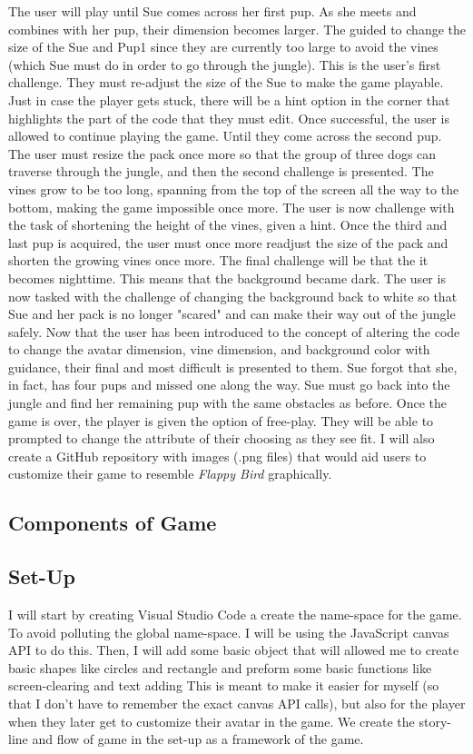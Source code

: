 \documentclass[10pt,twocolumn]{article}
\begin{document}
The user will play until Sue comes across her first pup. As she meets and combines with her pup, their dimension becomes larger. The guided to change the size of the Sue and Pup1 since they are currently too large to avoid the vines (which Sue must do in order to go through the jungle). This is the user's first challenge. They must re-adjust the size of the Sue to make the game playable. Just in case the player gets stuck, there will be a hint option in the corner that highlights the part of the code that they must edit. Once successful, the user is allowed to continue playing the game. Until they come across the second pup. The user must resize the pack once more so that the group of three dogs can traverse through the jungle, and then the second challenge is presented. The vines grow to be too long, spanning from the top of the screen all the way to the bottom, making the game impossible once more. The user is now challenge with the task of shortening the height of the vines, given a hint. Once the third and last pup is acquired, the user must once more readjust the size of the pack and shorten the growing vines once more. The final challenge will be that the it becomes nighttime. This means that the background became dark. The user is now tasked with the challenge of changing the background back to white so that Sue and her pack is no longer "scared" and can make their way out of the jungle safely.
Now that the user has been introduced to the concept of altering the code to change the avatar dimension, vine dimension, and background color with guidance, their final and most difficult is presented to them. Sue forgot that she, in fact, has four pups and missed one along the way. Sue must go back into the jungle and find her remaining pup with the same obstacles as before. Once the game is over, the player is given the option of free-play.
They will be able to prompted to change the attribute of their choosing as they see fit. I will also create a GitHub repository with images (.png files) that would aid users to customize their game to resemble \textit{Flappy Bird} \cite{Nguyen} graphically. 

\subsection{Components of Game}
\subsection{Set-Up}
I will start by creating Visual Studio Code a create the name-space for the game. To avoid polluting the global name-space. I will be using the JavaScript canvas API to do this. Then, I will add some basic object that will allowed me to create basic shapes like circles and rectangle and preform some basic functions like screen-clearing and text adding This is meant to make it easier for myself (so that I don't have to remember the exact canvas API calls), but also for the player when they later get to customize their avatar in the game. We create the story-line and flow of game in the set-up as a framework of the game.
\end{document}
